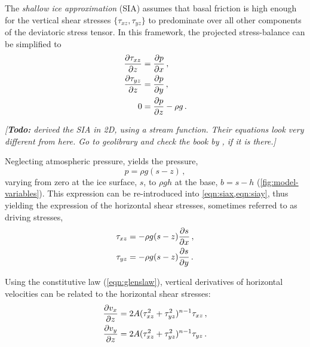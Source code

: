 \documentclass{article}
\newcommand{\todo}[1]{\emph{[\textbf{Todo:} #1]}}
\begin{document}
The \emph{shallow ice approximation} (SIA) assumes that basal friction is high
enough
for the vertical shear stresses $\{\tau_{xz}, \tau_{yz}\}$ to predominate over
all other components of the deviatoric stress tensor. In this framework, the
projected stress-balance can be simplified to
\begin{subequations}
\label{eqn:sia}
\begin{align}
    \label{eqn:siax}
    \pdv{\tau_{xz}}{z} &= \pdv{p}{x} \,, \\
    \label{eqn:siay}
    \pdv{\tau_{yz}}{z} &= \pdv{p}{y} \,, \\
    \label{eqn:siaz}
    0 &= \pdv{p}{z} - \rho g \,.
\end{align}
\end{subequations}

\todo{\citet{Morland.Johnson.1980} derived the SIA in 2D, using a stream
      function. Their equations look very different from here. Go to
      geolibrary and check the book by \citet{Hutter.1983}, if it is there.}

Neglecting atmospheric pressure,  yields the pressure,
\begin{equation}
    p = \rho g (s-z) \,,
\end{equation}
varying from zero at the ice surface, $s$, to $\rho gh$ at the base, ${b=s-h}$
(\cref{fig:model-variables}). This expression
can be re-introduced into \cref{eqn:siax,eqn:siay}, thus yielding the
expression of the horizontal shear stresses, sometimes referred to as driving
stresses,
\begin{subequations}
\begin{align}
    \tau_{xz} &= -\rho g (s-z) \pdv{s}{x} \,, \\
    \tau_{yz} &= -\rho g (s-z) \pdv{s}{y} \,.
\end{align}
\end{subequations}

Using the constitutive law (\ref{eqn:glenslaw}), vertical derivatives of
horizontal velocities can be related to the horizontal shear stresses:
\begin{subequations}
\begin{align}
    \pdv{v_x}{z} &= 2A (\tau_{xz}^2 + \tau_{yz}^2)^{n-1} \tau_{xz} \,, \\
    \pdv{v_y}{z} &= 2A (\tau_{xz}^2 + \tau_{yz}^2)^{n-1} \tau_{yz} \,.
\end{align}
\end{subequations}
\end{document}
